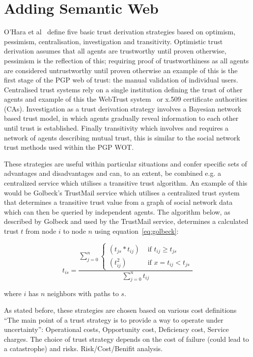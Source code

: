 \documentclass{acm_proc_article-sp}
\begin{document}
\section{Adding Semantic Web}
O'Hara et al~\cite{ohara_trust_2004} define five basic trust derivation strategies based on optimism, pessimism, centralisation, investigation and transitivity.  Optimistic trust derivation assumes that all agents are trustworthy until proven otherwise, pessimism is the reflection of this; requiring proof of trustworthiness as all agents are considered untrustworthy until proven otherwise an example of this is the first stage of the PGP web of trust: the manual validation of individual users.  Centralised trust systems rely on a single institution defining the trust of other agents and example of this the WebTrust system~\cite{golbeck_trust_2003} or x.509 certificate authorities (CAs).  Investigation as a trust derivation strategy involves a Bayesian network based trust model, in which agents gradually reveal information to each other until trust is established.  Finally transitivity which involves and requires a network of agents describing mutual trust, this is similar to the social network trust methods used within the PGP WOT.

These strategies are useful within particular situations and confer specific sets of advantages and disadvantages and can, to an extent, be combined e.g. a centralized service which utilises a transitive trust algorithm.  An example of this would be Golbeck's TrustMail service which utilises a centralized trust system that determines a transitive trust value from a graph of social network data which can then be queried by independent agents.  The algorithm below, as described by Golbeck and used by the TrustMail service, determines a calculated trust $t$ from node $i$ to node $n$ using equation~\ref{eq:golbeck}:

\begin{equation}\label{eq:golbeck}
t_{is}=\frac{\sum_{j=0}^{n}{\begin{cases}
(t_{js}*t_{ij}) & \text{ if } t_{ij} \geq t_{js} \\ 
(t_{ij}^2) & \text{ if } x= t_{ij} < t_{js}
\end{cases}}}{\sum_{j=0}^{n}{t_{ij}}}
\end{equation}

where $i$ has $n$ neighbors with paths to $s$.

As stated before, these strategies are chosen based on various cost definitions ``The main point of a trust strategy is to provide a way to operate under uncertainty'': Operational costs, Opportunity cost, Deficiency cost, Service charges. The choice of trust strategy depends on the cost of failure (could lead to a catastrophe) and risks.  Risk/Cost/Benifit analysis.
\end{document}
